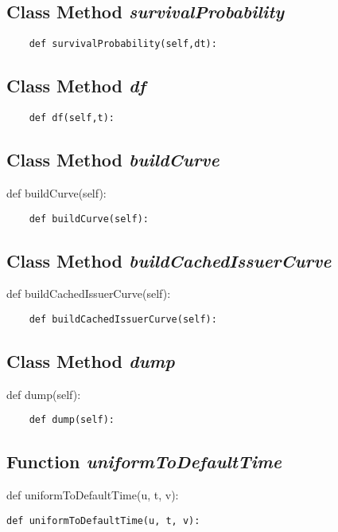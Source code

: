\documentclass[twoside,11pt]{book}
\begin{document}
\subsection{Class Method {\it survivalProbability}}


\begin{lstlisting}
    def survivalProbability(self,dt):
\end{lstlisting}

\subsection{Class Method {\it df}}


\begin{lstlisting}
    def df(self,t):
\end{lstlisting}

\subsection{Class Method {\it buildCurve}}
def buildCurve(self):

\begin{lstlisting}
    def buildCurve(self):
\end{lstlisting}

\subsection{Class Method {\it buildCachedIssuerCurve}}
def buildCachedIssuerCurve(self):

\begin{lstlisting}
    def buildCachedIssuerCurve(self):
\end{lstlisting}

\subsection{Class Method {\it dump}}
def dump(self):

\begin{lstlisting}
    def dump(self):
\end{lstlisting}

\subsection{Function {\it uniformToDefaultTime}}
def uniformToDefaultTime(u, t, v):

\begin{lstlisting}
def uniformToDefaultTime(u, t, v):
\end{lstlisting}
\end{document}
